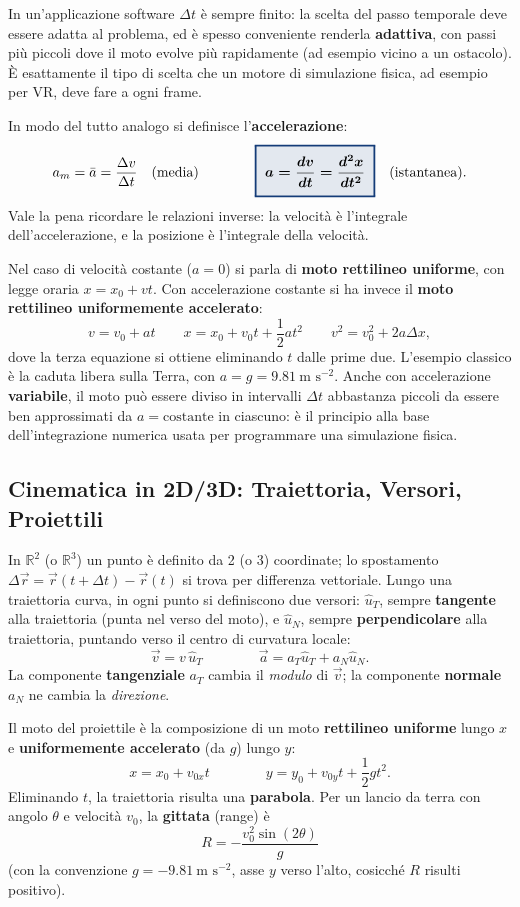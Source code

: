 \documentclass[a4paper,11pt]{article}
\newcommand{\keyeq}[1]{{\setlength{\fboxsep}{6pt}\setlength{\fboxrule}{1.3pt}\fcolorbox{chapblue}{chapblue!12}{\boldmath$\displaystyle #1$}}}
\begin{document}
In un'applicazione software $\Delta t$ è sempre finito: la scelta del passo temporale deve essere adatta al problema, ed è spesso conveniente renderla \textbf{adattiva}, con passi più piccoli dove il moto evolve più rapidamente (ad esempio vicino a un ostacolo). È esattamente il tipo di scelta che un motore di simulazione fisica, ad esempio per VR, deve fare a ogni frame.

In modo del tutto analogo si definisce l'\textbf{accelerazione}:
\[
a_m = \bar a = \frac{\Delta v}{\Delta t} \quad \text{(media)} \qquad\qquad \keyeq{a = \frac{dv}{dt} = \frac{d^2x}{dt^2}} \quad \text{(istantanea)}.
\]
Vale la pena ricordare le relazioni inverse: la velocità è l'integrale dell'accelerazione, e la posizione è l'integrale della velocità.

Nel caso di velocità costante ($a=0$) si parla di \textbf{moto rettilineo uniforme}, con legge oraria $x=x_0+vt$. Con accelerazione costante si ha invece il \textbf{moto rettilineo uniformemente accelerato}:
\[
v = v_0 + at \qquad x = x_0 + v_0t + \frac12 at^2 \qquad v^2 = v_0^2 + 2a\Delta x,
\]
dove la terza equazione si ottiene eliminando $t$ dalle prime due. L'esempio classico è la caduta libera sulla Terra, con $a=g=9.81\ \text{m s}^{-2}$. Anche con accelerazione \textbf{variabile}, il moto può essere diviso in intervalli $\Delta t$ abbastanza piccoli da essere ben approssimati da $a=\text{costante}$ in ciascuno: è il principio alla base dell'integrazione numerica usata per programmare una simulazione fisica.

\subsection{Cinematica in 2D/3D: Traiettoria, Versori, Proiettili}

In $\mathbb{R}^2$ (o $\mathbb{R}^3$) un punto è definito da 2 (o 3) coordinate; lo spostamento $\Delta\vec r = \vec r(t+\Delta t)-\vec r(t)$ si trova per differenza vettoriale. Lungo una traiettoria curva, in ogni punto si definiscono due versori: $\hat u_T$, sempre \textbf{tangente} alla traiettoria (punta nel verso del moto), e $\hat u_N$, sempre \textbf{perpendicolare} alla traiettoria, puntando verso il centro di curvatura locale:
\[
\vec v = v\,\hat u_T \qquad\qquad \vec a = a_T\hat u_T + a_N \hat u_N.
\]
La componente \textbf{tangenziale} $a_T$ cambia il \emph{modulo} di $\vec v$; la componente \textbf{normale} $a_N$ ne cambia la \emph{direzione}.

Il moto del proiettile è la composizione di un moto \textbf{rettilineo uniforme} lungo $x$ e \textbf{uniformemente accelerato} (da $g$) lungo $y$:
\[
x = x_0 + v_{0x}t \qquad\qquad y = y_0 + v_{0y}t + \frac12 gt^2.
\]
Eliminando $t$, la traiettoria risulta una \textbf{parabola}. Per un lancio da terra con angolo $\theta$ e velocità $v_0$, la \textbf{gittata} (range) è
\[
R = -\frac{v_0^2\sin(2\theta)}{g}
\]
(con la convenzione $g=-9.81\ \text{m s}^{-2}$, asse $y$ verso l'alto, cosicché $R$ risulti positivo).
\end{document}
